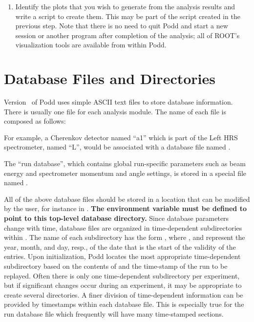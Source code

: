 {{\begin{enumerate}
	in Step~\ref{offl:item:step3}. Often, a script from a
	previous experiment, or one of the examples in
	the directory , can serve as a guide.
	The script usually also locates raw data files, creates
	one or more  objects, configures various
	options of the event loop object , and
	starts the replay. In particular, the names of the output
	file, the output definition file, and the logicals definition
	file must be given to .
  \item Identify the plots that you wish to generate from the analysis
        results and write a script to create them. This may be part
	of the script created in the previous step. 
	Note that there is no need to quit Podd and start a new
	session or another program after completion of the analysis; all of
	ROOT's visualization tools are available from within Podd.
\end{enumerate}

\section{Database Files and Directories}
\label{offl:sec:database}
Version \cppaver\ of Podd uses simple ASCII text files
to store database information. There is usually one file for each 
analysis module. The name of each file is composed as follows:\\

\noindent {}
\vspace{2ex}

For example, a Cherenkov detector named ``a1'' which is part of the
Left HRS spectrometer, named ``L'', would be associated with 
a database file named .

The ``run database'', which contains global run-specific parameters
such as beam energy and spectrometer momentum and angle settings,
is stored in a special file named .

All of the above database files should be stored in a location
that can be modified by the user, for instance in .
{\bf The environment variable 
must be defined to point to this top-level database
directory.} Since database parameters change with time, database files
are organized in time-dependent subdirectories within .
The name of each subdirectory has the form , where 
,  and  
represent the year, month, and day, resp., of the 
date that is the start of the validity of the entries. Upon initialization,
Podd locates the most appropriate time-dependent subdirectory based on
the contents of  
and the time-stamp of the run to be replayed.
Often there is only one time-dependent subdirectory per experiment, but
if significant changes occur during an experiment, it may be appropriate to
create several directories.
A finer division of time-dependent information
can be provided by timestamps within each database file. This
is especially true for the run database file which frequently
will have many time-stamped sections.

}}
